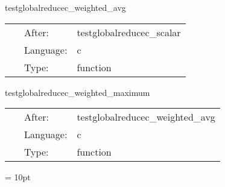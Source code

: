 \vspace{5mm}


\hspace{5mm} testglobalreducec\_weighted\_avg 

\hspace{5mm}{\it test weighted global average reduction } 


\hspace{5mm}

 \begin{tabular*}{160mm}{cll} 
~ & After:  & testglobalreducec\_scalar \\ 
~ & Language:  & c \\ 
~ & Type:  & function \\ 
\end{tabular*} 


\vspace{5mm}


\hspace{5mm} testglobalreducec\_weighted\_maximum 

\hspace{5mm}{\it test weighted global maximum reduction } 


\hspace{5mm}

 \begin{tabular*}{160mm}{cll} 
~ & After:  & testglobalreducec\_weighted\_avg \\ 
~ & Language:  & c \\ 
~ & Type:  & function \\ 
\end{tabular*} 



\vspace{5mm}\parskip = 10pt 

